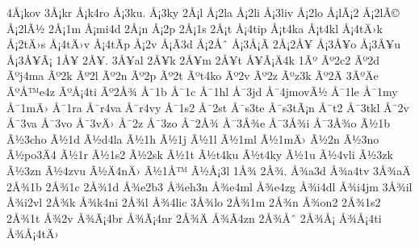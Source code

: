 {4Å¡kov
3Å¡kr
Å¡k4ro
Å¡3ku.
Å¡3ky
2Å¡l
Å¡2la
Å¡2li
Å¡3liv
Å¡2lo
Å¡lÃ¡2
Å¡2lÃ©
Å¡2lÃ½
2Å¡1m
Å¡mi4d
2Å¡n
Å¡2p
2Å¡1s
2Å¡t
Å¡4tip
Å¡t4ka
Å¡t4kl
Å¡4tÄ›k
Å¡2tÄ›s
Å¡4tÄ›v
Å¡4tÃ­p
Å¡2v
Å¡Ã­3d
Å¡2Åˆ
Å¡3Å¡Ã­
2Å¡2Å¥
Å¡3Å¥o
Å¡3Å¥u
Å¡3Å¥Ã¡
1Å¥
2Å¥.
3Å¥al
2Å¥k
2Å¥m
2Å¥t
Å¥Ã¡Ä4k
1Ãº
Ãº2c2
Ãº2d
Ãºj4ma
Ãº2k
Ãº2l
Ãº2n
Ãº2p
Ãº2t
Ãºt4ko
Ãº2v
Ãº2z
Ãºz3k
Ãº2Ä
3ÃºÄe
ÃºÅ™e4z
ÃºÅ¡4ti
Ãº2Å¾
Å¯1b
Å¯1c
Å¯1hl
Å¯3jd
Å¯4jmovÃ½
Å¯1le
Å¯1my
Å¯1mÄ›
Å¯1ra
Å¯r4va
Å¯r4vy
Å¯1s2
Å¯2st
Å¯s3te
Å¯s3tÃ¡n
Å¯t2
Å¯3tkl
Å¯2v
Å¯3va
Å¯3vo
Å¯3vÄ›
Å¯2z
Å¯3zo
Å¯2Å¾
Å¯3Å¾e
Å¯3Å¾i
Å¯3Å¾o
Ã½1b
Ã½3cho
Ã½1d
Ã½d4la
Ã½1h
Ã½1j
Ã½1l
Ã½1ml
Ã½1mÄ›
Ã½2n
Ã½3no
Ã½po3Ä4
Ã½1r
Ã½1s2
Ã½2sk
Ã½1t
Ã½t4ku
Ã½t4ky
Ã½1u
Ã½4vli
Ã½3zk
Ã½3zn
Ã½4zvu
Ã½Ä4nÄ›
Ã½1Å™
Ã½Å¡3l
1Å¾
2Å¾.
Å¾a3d
Å¾a4tv
3Å¾aÄ
2Å¾1b
2Å¾1c
2Å¾1d
Å¾e2b3
Å¾eh3n
Å¾e4ml
Å¾e4zg
Å¾i4dl
Å¾i4jm
3Å¾il
Å¾i2vl
2Å¾k
Å¾k4ni
2Å¾l
Å¾4lic
3Å¾lo
2Å¾1m
2Å¾n
Å¾on2
2Å¾1s2
2Å¾1t
Å¾2v
Å¾Ã¡4br
Å¾Ã¡4nr
2Å¾Ä
Å¾Ã­4zn
2Å¾Åˆ
2Å¾Å¡
Å¾Å¡4ti
Å¾Å¡4tÄ›
}
%
